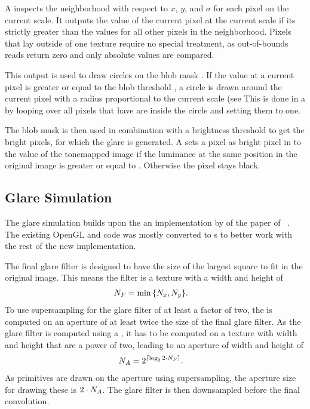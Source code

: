 A \computeshader{} inspects the neighborhood with respect to $x$, $y$, and $\sigma$ for each pixel on the current scale.
It outputs the value of the current pixel at the current scale if its strictly greater than the values for all other pixels in the neighborhood.
Pixels that lay outside of one texture require no special treatment, as out\hyp{}of\hyp{}bounds reads return zero and only absolute values are compared.

This output is used to draw circles on the blob mask \blobmask{}.
If the value at a current pixel is greater or equal to the blob threshold \blobthreshold{}, a circle is drawn around the current pixel with a radius proportional to the current scale (see %
This is done in a \computeshader{} by looping over all pixels that have are inside the circle and setting them to one.

The blob mask \blobmask{} is then used in combination with a brightness threshold \lightthreshold{} to get the bright pixels, for which the glare is generated.
A \computeshader{} sets a pixel as bright pixel in \overlay{} to the value of the tonemapped image \tonemappedimage{} if the luminance at the same position in the original image \image{} is greater or equal to \lightthreshold{}.
Otherwise the pixel stays black.



\subsection{Glare Simulation}
The glare simulation builds upon the an implementation \cite{GlareDemo} by \citeauthor{GlareDemo} of the paper of \citeauthor{Ritschel2009}~\cite{Ritschel2009}.
The existing OpenGL and \Cpp{} code was mostly converted to \DirectX{} \computeshader{}s to better work with the rest of the new implementation.

The final glare filter is designed to have the size of the largest square to fit in the original image.
This means the filter is a texture with a width and height of 
\begin{align}
	N_F &= \min{\left\lbrace \ensuremath{N_x}, \ensuremath{N_y}\right\rbrace}\text{.}
\end{align}
To use supersampling for the glare filter of at least a factor of two, the \Fft{} is computed on an aperture of at least twice the size of the final glare filter.
As the glare filter is computed using a \Fft{}, it has to be computed on a texture with width and height that are a power of two, leading to an aperture of width and height of
\begin{align}
	N_A &= 2^{\lceil\log_2 2\cdot N_F\rceil}\text{.}
\end{align}
As primitives are drawn on the aperture using supersampling, the aperture size for drawing these is $2 \cdot N_A$.
The glare filter is then downsampled before the final convolution.

